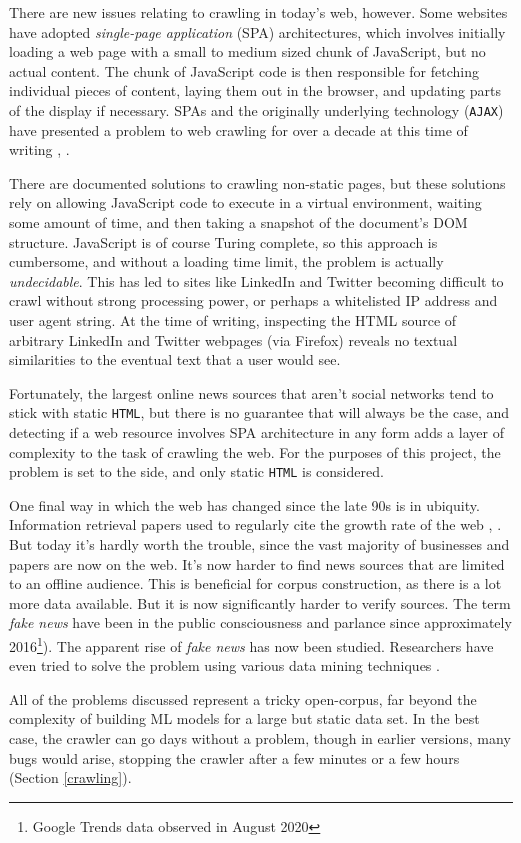 There are new issues relating to crawling in today's web, however.
Some websites have adopted {\it single-page application} (SPA)
architectures, which involves initially loading a web page
with a small to medium sized chunk of JavaScript, but no
actual content.  The chunk of JavaScript code is then responsible
for fetching individual pieces of content, laying them out in
the browser, and updating parts of the display if necessary.
SPAs and the originally underlying technology ({\tt AJAX}) have
presented a problem to web crawling for over a decade at this time
of writing \cite{matter2008}, \cite{mesbah2012}.

There are documented solutions to crawling non-static pages, but
these solutions rely on allowing JavaScript code to execute in
a virtual environment, waiting some amount of time, and
then taking a snapshot of the document's DOM structure.
JavaScript is of course Turing complete, so this approach is
cumbersome, and without a loading time limit, the problem is
actually {\it undecidable}.  This has led to sites like LinkedIn and
Twitter becoming difficult to crawl without strong processing
power, or perhaps a whitelisted IP address and user agent string.
At the time of writing, inspecting the HTML source of arbitrary
LinkedIn and Twitter webpages (via Firefox) reveals no textual
similarities to the eventual text that a user would see.

Fortunately, the largest online news sources that aren't social
networks tend to stick with static {\tt HTML}, but there is no
guarantee that will always be the case, and detecting if a web resource involves SPA architecture in any form adds a layer of
complexity to the task of crawling the web.  For the purposes of this project, the problem is set to the side, and only static
{\tt HTML} is considered.

One final way in which the web has changed since the late 90s
is in ubiquity.  Information retrieval papers used to regularly
cite the growth rate of the web \cite{page1998}, \cite{mcbryan1994}.
But today it's hardly worth the trouble, since the vast majority of
businesses and papers are now on the web.  It's now harder to find
news sources that are limited to an offline audience.  This
is beneficial for corpus construction, as there is a lot more
data available.  But it is now significantly harder to verify
sources.  The term {\it fake news} have been in the public consciousness
and parlance since approximately 2016\footnote{Google
Trends data observed in August 2020}).  The apparent rise of
{\it fake news} has now been studied.  Researchers have even
tried to solve the problem using various data mining
techniques \cite{shu2017fake}.

All of the problems discussed represent a tricky open-corpus,
far beyond the complexity of building ML models for a large but
static data set.  In the best case, the \nr{} crawler can go days
without a problem, though in earlier versions, many bugs would
arise, stopping the crawler after a few minutes or a few hours
(Section \ref{crawling}).
